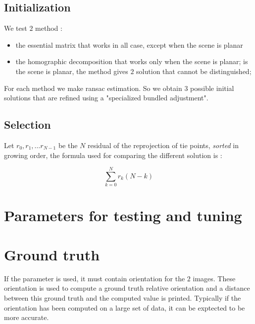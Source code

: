 \documentclass[a4paper]{article}
\begin{document}

\subsection{Initialization}

We test $2$ method :

\begin{itemize}
    \item  the essential matrix that works in all case, except when the scene is planar
    \item  the homographic decomposition that works only when the scene is planar;
	   is the scene is planar, the method gives $2$ solution that cannot be distinguished;
\end{itemize}

For each method we make ransac estimation.
So we obtain $3$ possible initial solutions that are refined using a "specialized bundled adjustment".


\subsection{Selection}

Let $r_0,r_1, \dots r_{N-1}$ be the $N$ residual of the reprojection of tie points,
\emph{sorted} in growing order,
the formula used for comparing the different solution is : 

\begin{equation}
	\sum_{k=0}^N  r_k (N-k)
\end{equation}




\section{Parameters for testing and tuning}

\section{Ground truth}

If the parameter  is used, it must contain orientation for the $2$ images. These
orientation is used to compute a ground truth relative orientation and a distance between
this ground truth and the computed value is printed.
Typically if the orientation has been computed on a large set of data, it can be exptected to
be more accurate.
\end{document}
